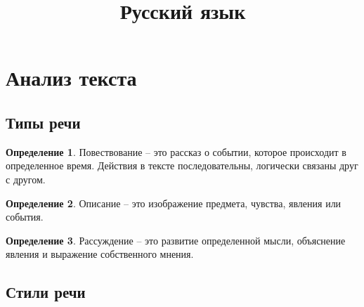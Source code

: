 \documentclass[12pt]{article}
\title{\textbf{Русский язык}}\date{}\author{}
\theoremstyle{definition}
\newtheorem{definition}{Определение}
\theoremstyle{remark}
\begin{document}
\maketitle
\tableofcontents
\label{toc}
\newpage

\section{Анализ текста}

\subsection{Типы речи}

\begin{definition}
    Повествование -- это рассказ о событии, которое происходит в определенное время. Действия в тексте последовательны, логически связаны друг с другом.
\end{definition}
\begin{definition}
    Описание -- это изображение предмета, чувства, явления или события.
\end{definition}
\begin{definition}
    Рассуждение -- это развитие определенной мысли, объяснение явления и выражение собственного мнения.
\end{definition}

\subsection{Стили речи}
\end{document}
